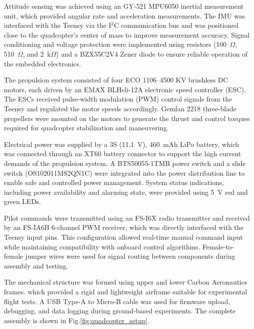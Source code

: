 \begin{small}
\begin{enumerate}
Attitude sensing was achieved using an GY-521 MPU6050 inertial measurement unit, which provided angular rate and acceleration measurements. The IMU was interfaced with the Teensy via the I$^2$C communication bus and was positioned close to the quadcopter’s center of mass to improve measurement accuracy. Signal conditioning and voltage protection were implemented using resistors (100~$\Omega$, 510~$\Omega$, and 2~k$\Omega$) and a BZX55C2V4 Zener diode to ensure reliable operation of the embedded electronics.

The propulsion system consisted of four ECO 1106--4500 KV brushless DC motors, each driven by an EMAX BLHeli-12A electronic speed controller (ESC). The ESCs received pulse-width modulation (PWM) control signals from the Teensy and regulated the motor speeds accordingly. Gemfan 2218 three-blade propellers were mounted on the motors to generate the thrust and control torques required for quadcopter stabilization and maneuvering.

Electrical power was supplied by a 3S (11.1~V), 460~mAh LiPo battery, which was connected through an XT60 battery connector to support the high current demands of the propulsion system. A BTS50055-1TMB power switch and a slide switch (OS102011MS2QN1C) were integrated into the power distribution line to enable safe and controlled power management. System status indications, including power availability and alarming state, were provided using 5~V red and green LEDs.

Pilot commands were transmitted using an FS-I6X radio transmitter and received by an FS-IA6B 6-channel PWM receiver, which was directly interfaced with the Teensy input pins. This configuration allowed real-time manual command input while maintaining compatibility with onboard control algorithms. Female-to-female jumper wires were used for signal routing between components during assembly and testing.

The mechanical structure was formed using upper and lower Carbon Aeronautics frames. which provided a rigid and lightweight airframe suitable for experimental flight tests. 
A USB Type-A to Micro-B cable was used for firmware upload, debugging, and data logging during ground-based experiments. 
The complete assembly is shown in Fig.\ref{fig:quadcopter_setup}.



\end{enumerate}
\end{small}
